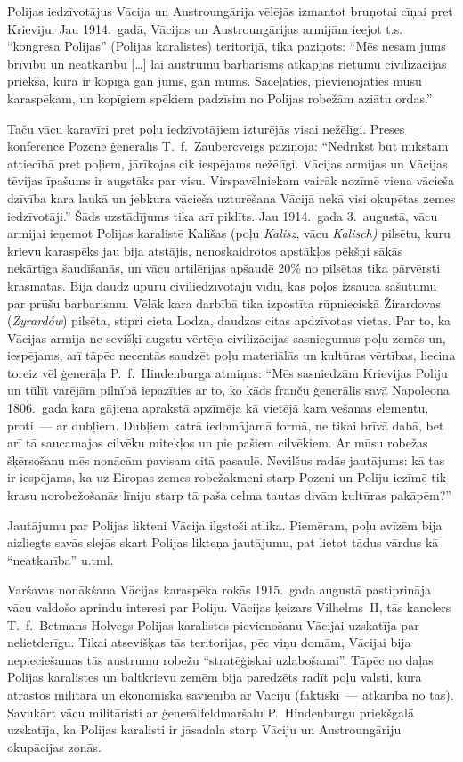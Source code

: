 \documentclass[twoside,a5paper,12pt,fleqn,openany]{extbook}
\newcommand{\pltxti}[1]{\textit{\textpolish{#1}}}
\newcommand{\detxti}[1]{\textit{\textgerman{#1}}}
\newcommand{\citespace}{[\dots{}]}
\begin{document}
Polijas iedzīvotājus Vācija un Austroungārija vēlējās izmantot bruņotai cīņai pret Krieviju. Jau 1914.~gadā, Vācijas un Austroungārijas armijām ieejot t.s. ``kongresa Polijas'' (Polijas karalistes) teritorijā, tika paziņots: ``Mēs nesam jums brīvību un neatkarību \citespace{} lai austrumu barbarisms atkāpjas rietumu civilizācijas priekšā, kura ir kopīga gan jums, gan mums. Saceļaties, pievienojaties mūsu karaspēkam, un kopīgiem spēkiem padzīsim no Polijas robežām aziātu ordas.''

Taču vācu karavīri pret poļu iedzīvotājiem izturējās visai nežēlīgi. Preses konferencē Pozenē ģenerālis T.~f.~Zaubercveigs paziņoja: ``Nedrīkst būt mīkstam attiecībā pret poļiem, jārīkojas cik iespējams nežēlīgi. Vācijas armijas un Vācijas tēvijas īpašums ir augstāks par visu. Virspavēlniekam vairāk nozīmē viena vācieša dzīvība kara laukā un jebkura vācieša uzturēšana Vācijā nekā visi okupētas zemes iedzīvotāji.'' Šāds uzstādījums tika arī pildīts. Jau 1914.~gada 3.~augustā, vācu armijai ieņemot Polijas karalistē Kališas (poļu \pltxti{Kalisz}, vācu \detxti{Kalisch)} pilsētu, kuru krievu karaspēks jau bija atstājis, nenoskaidrotos apstākļos pēkšņi sākās nekārtīga šaudīšanās, un vācu artilērijas apšaudē 20\% no pilsētas tika pārvērsti krāsmatās. Bija daudz upuru civiliedzīvotāju vidū, kas poļos izsauca sašutumu par prūšu barbarismu. Vēlāk kara darbībā tika izpostīta rūpnieciskā Žirardovas (\pltxti{Żyrardów}) pilsēta, stipri cieta Lodza, daudzas citas apdzīvotas vietas. Par to, ka Vācijas armija ne sevišķi augstu vērtēja civilizācijas sasniegumus poļu zemēs un, iespējams, arī tāpēc necentās saudzēt poļu materiālās un kultūras vērtības, liecina toreiz vēl ģenerāļa P.~f.~Hindenburga atmiņas: ``Mēs sasniedzām Krievijas Poliju un tūlīt varējām pilnībā iepazīties ar to, ko kāds franču ģenerālis savā Napoleona 1806.~gada kara gājiena aprakstā apzīmēja kā vietējā kara vešanas elementu, proti~--- ar dubļiem. Dubļiem katrā iedomājamā formā, ne tikai brīvā dabā, bet arī tā saucamajos cilvēku mitekļos un pie pašiem cilvēkiem. Ar mūsu robežas šķērsošanu mēs nonācām pavisam citā pasaulē. Nevilšus radās jautājums: kā tas ir iespējams, ka uz Eiropas zemes robežakmeņi starp Pozeni un Poliju iezīmē tik krasu norobežošanās līniju starp tā paša celma tautas divām kultūras pakāpēm?''

Jautājumu par Polijas likteni Vācija ilgstoši atlika. Piemēram, poļu avīzēm bija aizliegts savās slejās skart Polijas likteņa jautājumu, pat lietot tādus vārdus kā ``neatkarība'' u.tml.

Varšavas nonākšana Vācijas karaspēka rokās 1915.~gada augustā pastiprināja vācu valdošo aprindu interesi par Poliju. Vācijas ķeizars Vilhelms~II, tās kanclers T.~f.~Betmans Holvegs Polijas karalistes pievienošanu Vācijai uzskatīja par nelietderīgu. Tikai atsevišķas tās teritorijas, pēc viņu domām, Vācijai bija nepieciešamas tās austrumu robežu ``stratēģiskai uzlabošanai''. Tāpēc no daļas Polijas karalistes un baltkrievu zemēm bija paredzēts radīt poļu valsti, kura atrastos militārā un ekonomiskā savienībā ar Vāciju (faktiski~--- atkarībā no tās). Savukārt vācu militāristi ar ģenerālfeldmaršalu P.~Hindenburgu priekšgalā uzskatīja, ka Polijas karalisti ir jāsadala starp Vāciju un Austroungāriju okupācijas zonās.
\end{document}
